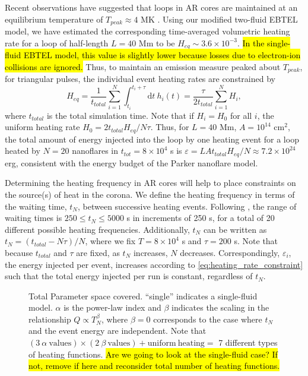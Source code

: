 \documentclass[apj]{emulateapj}
\begin{document}
%
	\par Recent observations have suggested that loops in AR cores are maintained at an equilibrium temperature of $T_{peak}\approx4$ MK \citep{warren_constraints_2011,warren_systematic_2012}. Using our modified two-fluid EBTEL model, we have estimated the corresponding time-averaged volumetric heating rate for a loop of half-length $L=40$ Mm to be  $H_{eq}\sim3.6\times10^{-3}$. \hl{In the single-fluid EBTEL model, this value is slightly lower because losses due to electron-ion collisions are ignored.} Thus, to maintain an emission measure peaked about $T_{peak}$, for triangular pulses, the individual event heating rates are constrained by 
	\begin{equation}
		\label{eq:heating_rate_constraint}
		H_{eq} = \frac{1}{t_{total}}\sum_{i=1}^N\int_{t_i}^{t_i+\tau}\mathrm{d}t~h_i(t) = \frac{\tau}{2t_{total}}\sum_{i=1}^NH_i,
	\end{equation}
	where $t_{total}$ is the total simulation time. Note that if $H_i=H_0$ for all $i$, the uniform heating rate $H_0=2t_{total}H_{eq}/N\tau$. Thus, for $L=40$ Mm, $A=10^{14}$ cm$^2$, the total amount of energy injected into the loop by one heating event for a loop heated by $N=20$ nanoflares in $t_{tot}=8\times10^4$ s is $\varepsilon=LAt_{total}H_{eq}/N\approx7.2\times10^{24}$ erg, consistent with the energy budget of the Parker nanoflare model. 
	\par Determining the heating frequency in AR cores will help to place constraints on the source(s) of heat in the corona. We define the heating frequency in terms of the waiting time, $t_N$, between successive heating events. Following \citet{cargill_active_2014}, the range of waiting times is $250\le t_N\le5000$ s in increments of 250 s, for a total of 20 different possible heating frequencies. Additionally, $t_N$ can be written as $t_N=(t_{total}-N\tau)/N$, where we fix $T=8\times10^4$ s and $\tau=200$ s. Note that because $t_{total}$ and $\tau$ are fixed, as $t_N$ increases, $N$ decreases. Correspondingly, $\varepsilon_i$, the energy injected per event, increases according to \autoref{eq:heating_rate_constraint} such that the total energy injected per run is constant, regardless of $t_N$.
	\begin{figure}
		\centering
		
		\caption{Total Parameter space covered. ``single'' indicates a single-fluid model. $\alpha$ is the power-law index and $\beta$ indicates the scaling in the relationship $Q\propto T_N^{\beta}$, where $\beta=0$ corresponds to the case where $t_N$ and the event energy are independent. Note that $(3~\alpha~\mathrm{values})\times(2~\beta~\mathrm{values})+\mathrm{uniform~heating}=$ 7 different types of heating functions. \hl{Are we going to look at the single-fluid case? If not, remove if here and reconsider total number of heating functions.}}
		\label{fig:parameter_space}
	\end{figure}
\end{document}
